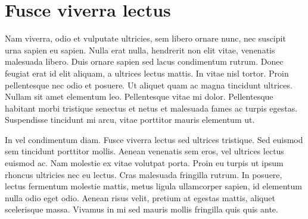 \chapter{Fusce viverra lectus}\label{app:one}

Nam viverra, odio et vulputate ultricies, sem libero ornare nunc, nec suscipit urna sapien eu sapien. Nulla erat nulla, hendrerit non elit vitae, venenatis malesuada libero. Duis ornare sapien sed lacus condimentum rutrum. Donec feugiat erat id elit aliquam, a ultrices lectus mattis. In vitae nisl tortor. Proin pellentesque nec odio et posuere. Ut aliquet quam ac magna tincidunt ultrices. Nullam sit amet elementum leo. Pellentesque vitae mi dolor. Pellentesque habitant morbi tristique senectus et netus et malesuada fames ac turpis egestas. Suspendisse tincidunt mi arcu, vitae porttitor mauris elementum ut.\par

In vel condimentum diam. Fusce viverra lectus sed ultrices tristique. Sed euismod sem tincidunt porttitor mollis. Aenean venenatis sem eros, vel ultrices lectus euismod ac. Nam molestie ex vitae volutpat porta. Proin eu turpis ut ipsum rhoncus ultricies nec eu lectus. Cras malesuada fringilla rutrum. In posuere, lectus fermentum molestie mattis, metus ligula ullamcorper sapien, id elementum nulla odio eget odio. Aenean risus velit, pretium at egestas mattis, aliquet scelerisque massa. Vivamus in mi sed mauris mollis fringilla quis quis ante. 